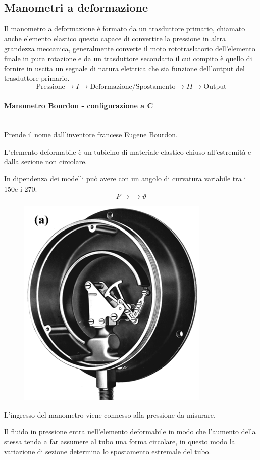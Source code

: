 \documentclass[a4paper, 15pt]{article}
\begin{document}
\subsection{Manometri a deformazione}		
\begin{adjustwidth}{2in}{}  		
  		 Il manometro a deformazione è formato da un trasduttore primario, chiamato anche elemento elastico questo capace di convertire la pressione in altra grandezza meccanica, generalmente converte il moto rototraslatorio dell'elemento finale in pura rotazione e da un trasduttore secondario il cui compito è quello di fornire in uscita un segnale di natura elettrica che sia funzione dell'output del trasduttore primario. 
  		 \[\text{Pressione}\rightarrow\boxed{I}\rightarrow \text{Deformazione/Spostamento} \rightarrow \boxed{II}\rightarrow\text{Output}\]  		 
\paragraph{Manometro Bourdon - configurazione a C}\mbox{} \\ 
		Prende il nome dall'inventore francese Eugene Bourdon. 
		
		L'elemento deformabile è un tubicino di materiale elastico chiuso all'estremità e  dalla sezione non circolare. 
		
		In dipendenza dei modelli può avere con un angolo di curvatura variabile tra i 150\degree e i 270\degree.		
		\[P\rightarrow\boxed{}\rightarrow \vartheta\]
  		 \begin{figure}[H]
  		 	\centering
  		 	\includegraphics[width=0.2\linewidth]{immagini/manometro3}
  		 	\label{fig:manometro3}
  		 \end{figure}
  		 L'ingresso del manometro viene connesso alla pressione da misurare.
  		 
  		 Il fluido in pressione entra nell'elemento deformabile in modo che l'aumento della stessa tenda a far assumere al tubo una forma circolare, in questo modo la variazione di sezione determina lo spostamento estremale del tubo. 
  		 

\end{adjustwidth}
\end{document}
